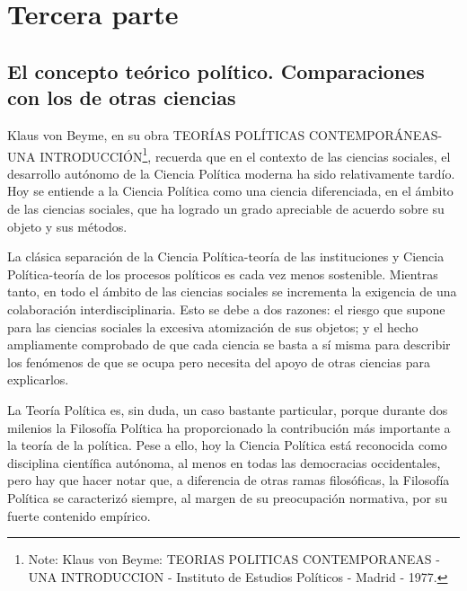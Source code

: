 \documentclass[
]{book}
\begin{document}
\hypertarget{tercera-parte}{%
\section*{Tercera parte}\label{tercera-parte}}

\hypertarget{el-concepto-teuxf3rico-poluxedtico.-comparaciones-con-los-de-otras-ciencias}{%
\subsection*{El concepto teórico político. Comparaciones con los de otras ciencias}\label{el-concepto-teuxf3rico-poluxedtico.-comparaciones-con-los-de-otras-ciencias}}

Klaus von Beyme, en su obra TEORÍAS POLÍTICAS CONTEMPORÁNEAS-UNA INTRODUCCIÓN\footnote{Note: Klaus von Beyme: TEORIAS POLITICAS CONTEMPORANEAS - UNA INTRODUCCION - Instituto de Estudios Políticos - Madrid - 1977.}, recuerda que en el contexto de las ciencias sociales, el desarrollo autónomo de la Ciencia Política moderna ha sido relativamente tardío. Hoy se entiende a la Ciencia Política como una ciencia diferenciada, en el ámbito de las ciencias sociales, que ha logrado un grado apreciable de acuerdo sobre su objeto y sus métodos.

La clásica separación de la Ciencia Política-teoría de las instituciones y Ciencia Política-teoría de los procesos políticos es cada vez menos sostenible. Mientras tanto, en todo el ámbito de las ciencias sociales se incrementa la exigencia de una colaboración interdisciplinaria. Esto se debe a dos razones: el riesgo que supone para las ciencias sociales la excesiva atomización de sus objetos; y el hecho ampliamente comprobado de que cada ciencia se basta a sí misma para describir los fenómenos de que se ocupa pero necesita del apoyo de otras ciencias para explicarlos.

La Teoría Política es, sin duda, un caso bastante particular, porque durante dos milenios la Filosofía Política ha proporcionado la contribución más importante a la teoría de la política. Pese a ello, hoy la Ciencia Política está reconocida como disciplina científica autónoma, al menos en todas las democracias occidentales, pero hay que hacer notar que, a diferencia de otras ramas filosóficas, la Filosofía Política se caracterizó siempre, al margen de su preocupación normativa, por su fuerte contenido empírico.
\end{document}
